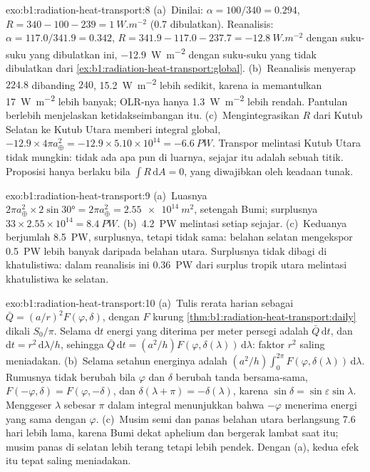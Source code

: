 \begin{solution}{exo:b1:radiation-heat-transport:8}
(a)~Dinilai: $\alpha = 100/340 = 0.294$, $R = 340 - 100 - 239 =
\qty{+1}{W.m^{-2}}$ (\num{0.7} dibulatkan). Reanalisis: $\alpha = 117.0/341.9 =
0.342$, $R = 341.9 - 117.0 - 237.7 = \qty{-12.8}{W.m^{-2}}$ dengan suku-suku yang
dibulatkan ini, \qty{-12.9}{W.m^{-2}} dengan suku-suku yang tidak dibulatkan dari
\cref{ex:b1:radiation-heat-transport:global}. (b)~Reanalisis menyerap
$224.8$ dibanding $240$, \qty{15.2}{W.m^{-2}} lebih sedikit, karena ia memantulkan
\qty{17}{W.m^{-2}} lebih banyak; OLR-nya hanya \qty{1.3}{W.m^{-2}} lebih rendah. Pantulan
berlebih menjelaskan ketidakseimbangan itu. (c)~Mengintegrasikan $R$ dari Kutub Selatan ke
Kutub Utara memberi integral global, $-12.9 \times 4\pi a_\oplus^2 = -12.9 \times
5.10\times10^{14} = \qty{-6.6}{PW}$. Transpor melintasi Kutub Utara tidak mungkin: tidak ada
apa pun di luarnya, sejajar itu adalah sebuah titik. Proposisi hanya berlaku bila
$\int R\,\mathrm dA = 0$, yang diwajibkan oleh keadaan tunak.
\end{solution}

\begin{solution}{exo:b1:radiation-heat-transport:9}
(a)~Luasnya $2\pi a_\oplus^2 \times 2\sin\ang{30} = 2\pi a_\oplus^2 =
\qty{2.55e14}{m^2}$, setengah Bumi; surplusnya $33 \times 2.55\times10^{14} =
\qty{8.4}{PW}$. (b)~\qty{4.2}{PW} melintasi setiap sejajar. (c)~Keduanya berjumlah
\qty{8.5}{PW}, surplusnya, tetapi tidak sama: belahan selatan mengekspor
\qty{0.5}{PW} lebih banyak daripada belahan utara. Surplusnya tidak dibagi di
khatulistiwa: dalam reanalisis ini \qty{0.36}{PW} dari surplus tropik utara melintasi
khatulistiwa ke selatan.
\end{solution}

\begin{solution}{exo:b1:radiation-heat-transport:10}
(a)~Tulis rerata harian sebagai $\bar Q = (a/r)^2 F(\varphi, \delta)$, dengan $F$ kurung
\cref{thm:b1:radiation-heat-transport:daily} dikali $S_0/\pi$. Selama $\mathrm dt$ energi
yang diterima per meter persegi adalah $\bar Q\,\mathrm dt$, dan
$\mathrm dt = r^2\,\mathrm d\lambda/h$, sehingga $\bar Q\,\mathrm dt = (a^2/h)
F(\varphi, \delta(\lambda))\,\mathrm d\lambda$: faktor $r^2$ saling meniadakan.
(b)~Selama setahun energinya adalah $(a^2/h)\int_0^{2\pi} F(\varphi,
\delta(\lambda))\,\mathrm d\lambda$. Rumusnya tidak berubah bila $\varphi$ dan
$\delta$ berubah tanda bersama-sama, $F(-\varphi, \delta) = F(\varphi, -\delta)$, dan
$\delta(\lambda + \pi) = -\delta(\lambda)$, karena $\sin\delta = \sin\varepsilon
\sin\lambda$. Menggeser $\lambda$ sebesar $\pi$ dalam integral menunjukkan bahwa $-\varphi$
menerima energi yang sama dengan $\varphi$. (c)~Musim semi dan panas belahan utara
berlangsung \num{7.6} hari lebih lama, karena Bumi dekat aphelium dan bergerak lambat saat
itu; musim panas di selatan lebih terang tetapi lebih pendek. Dengan (a), kedua efek
itu tepat saling meniadakan.
\end{solution}


